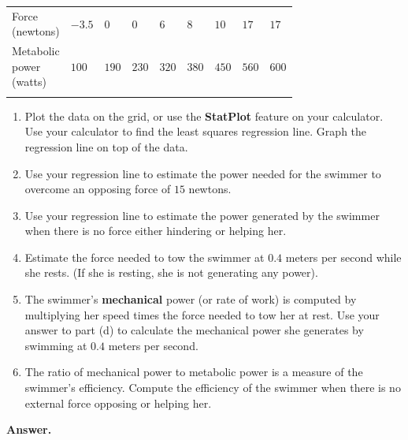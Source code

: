 \documentclass[10pt,]{book}
\makeatletter
\newcommand{\terminology}[1]{\textbf{#1}}
\theoremstyle{plain}
\theoremstyle{definition}
\theoremstyle{definition}
\theoremstyle{definition}
\theoremstyle{definition}
\numberwithin{equation}{part}
\newcommand{\hrulethin}  {\noalign{\hrule height 0.04em}}
\newcommand{\tablecelllines}[3]%
{\begin{tabular}[#2]{@{}#1@{}}#3\end{tabular}}
\makeatother
\begin{document}
\begin{exerciselist}
\begin{table}
\centering
\begin{tabular}{AlA}\hrulethin
\tablecelllines{l}{m}
{Force\\
(newtons)}
&\(-3.5\)&\(0\)&\(0\)&\(6\)&\(8\)&\(10\)&\(17\)&\(17\)\tabularnewline\hrulethin
\tablecelllines{l}{m}
{Metabolic\\
power\\
(watts)}
&\(100\)&\(190\)&\(230\)&\(320\)&\(380\)&\(450\)&\(560\)&\(600\)\tabularnewline\hrulethin
\end{tabular}
\end{table}
 \leavevmode%
\begin{enumerate}[label=*\alph**]
\item\hypertarget{li-1494}{}Plot the data on the grid, or use the \terminology{StatPlot} feature on your calculator. Use your calculator to find the least squares regression line. Graph the regression line on top of the data.%
\item\hypertarget{li-1495}{}Use your regression line to estimate the power needed for the swimmer to overcome an opposing force of \(15\) newtons.%
\item\hypertarget{li-1496}{}Use your regression line to estimate the power generated by the swimmer when there is no force either hindering or helping her.%
\item\hypertarget{li-1497}{}Estimate the force needed to tow the swimmer at \(0.4\) meters per second while she rests. (If she is resting, she is not generating any power).%
\item\hypertarget{li-1498}{}The swimmer's \terminology{mechanical} power (or rate of work) is computed by multiplying her speed times the force needed to tow her at rest. Use your answer to part (d) to calculate the mechanical power she generates by swimming at \(0.4\) meters per second.%
\item\hypertarget{li-1499}{}The ratio of mechanical power to metabolic power is a measure of the swimmer's efficiency. Compute the efficiency of the swimmer when there is no external force opposing or helping her.%
\end{enumerate}
%
\par\smallskip
\par\smallskip
\noindent\textbf{Answer.}\hypertarget{answer-221}{}\quad
\leavevmode%
\begin{multicols}{2}
\begin{enumerate}[label=*\alph**]

\end{enumerate}
\end{multicols}
\end{exerciselist}
\end{document}
